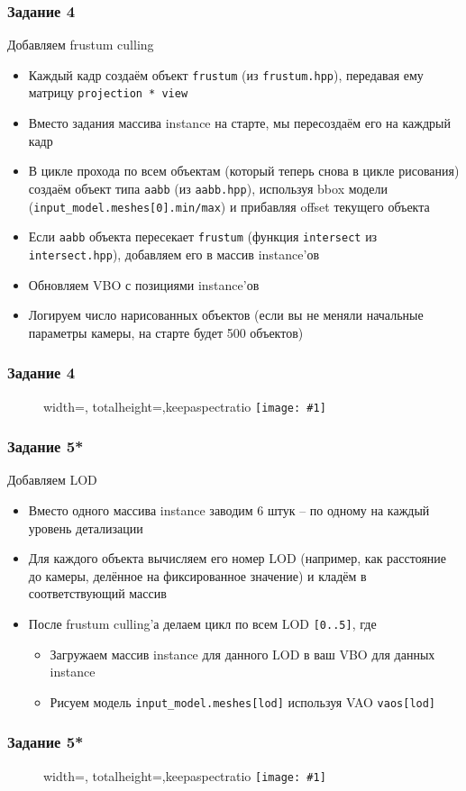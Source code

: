 \documentclass{beamer}
\newcommand{\slideimage}[1]{
  \begin{figure}
    \begin{adjustbox}{width=\textwidth, totalheight=\textheight-2\baselineskip-2\baselineskip,keepaspectratio}
      \texttt{[image: \#1]}
    \end{adjustbox}
  \end{figure}
}
\begin{document}
\begin{frame}[fragile]
\fontsize{10pt}{10pt}
\frametitle{Задание 4}
Добавляем frustum culling
\begin{itemize}
\item Каждый кадр создаём объект \verb|frustum| (из \verb|frustum.hpp|), передавая ему матрицу \verb|projection * view|
\item Вместо задания массива instance на старте, мы пересоздаём его на каждрый кадр
\item В цикле прохода по всем объектам (который теперь снова в цикле рисования) создаём объект типа \verb|aabb| (из \verb|aabb.hpp|), используя bbox модели (\verb|input_model.meshes[0].min/max|) и прибавляя offset текущего объекта
\item Если \verb|aabb| объекта пересекает \verb|frustum| (функция \verb|intersect| из \verb|intersect.hpp|), добавляем его в массив instance'ов
\item Обновляем VBO с позициями instance'ов
\item Логируем число нарисованных объектов (если вы не меняли начальные параметры камеры, на старте будет 500 объектов)
\end{itemize}
\end{frame}

\begin{frame}
\frametitle{Задание 4}
\slideimage{2.png}
\end{frame}

\begin{frame}[fragile]
\fontsize{10pt}{10pt}
\frametitle{Задание 5*}
Добавляем LOD
\begin{itemize}
\item Вместо одного массива instance заводим 6 штук -- по одному на каждый уровень детализации
\item Для каждого объекта вычисляем его номер LOD (например, как расстояние до камеры, делённое на фиксированное значение) и кладём в соответствующий массив
\item После frustum culling'а делаем цикл по всем LOD \verb|[0..5]|, где
\begin{itemize}
\item Загружаем массив instance для данного LOD в ваш VBO для данных instance
\item Рисуем модель \verb|input_model.meshes[lod]| используя VAO \verb|vaos[lod]|
\end{itemize}
\end{itemize}
\end{frame}

\begin{frame}
\frametitle{Задание 5*}
\slideimage{5.png}
\end{frame}
\end{document}
